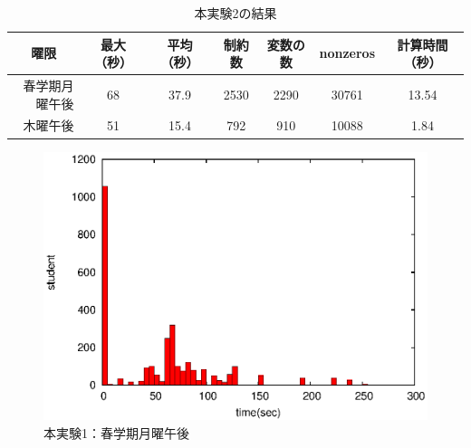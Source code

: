 \documentclass[12pt, a4paper, fleqn]{jreport}
\begin{document}
\begin{table}[H]
\caption{本実験2の結果}
\label{jikken2_kekka}
\vspace{-5.0mm}
\begin{center}
\begin{tabular}{|r|cccccc|}
\hline
\multicolumn{1}{|c|}{曜限} & 最大（秒） & 平均（秒） & 制約数 & 変数の数 & nonzeros & 計算時間（秒）\\
\hline
春学期月曜午後  & 68 & 37.9 & 2530 & 2290 & 30761 &  13.54\\
      木曜午後  & 51 & 15.4 & 792  & 910  & 10088 &   1.84\\
\hline
\end{tabular}
\end{center}
\end{table}

\begin{figure}[htpb]                        
\begin{minipage} {0.5\hsize}                             
\begin{center}                              
\includegraphics[bb=0 0 390 248,clip,width=\hsize]{oMo345_hist.eps}   
本実験1：春学期月曜午後
\end{center}                                    
\end{minipage}                                 
\begin{minipage}{0.5\hsize}                                            
\begin{center}                              

\end{center}
\end{minipage}
\end{figure}
\end{document}

